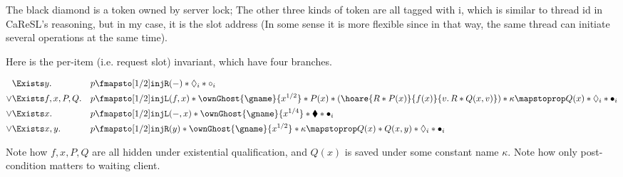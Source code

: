 \documentclass[11pt]{article}
\newcommand{\bdia}{\blacklozenge}
\newcommand{\dia}{\Diamond}
\newcommand{\injR}{\texttt{injR}}
\newcommand{\injL}{\texttt{injL}}
\begin{document}
The black diamond is a token owned by server lock; The other three kinds of token are all tagged with i, which is similar to thread id in CaReSL’s reasoning, but in my case, it is the slot address (In some sense it is more flexible since in that way, the same thread can initiate several operations at the same time).

Here is the per-item (i.e. request slot) invariant, which have four branches.

\begin{align*}
     &\Exists y.          &&p \fmapsto[1/2] \injR(-) * \dia_i * \circ_i\\
\lor &\Exists f, x, P, Q. &&p \fmapsto[1/2] \injL(f, x) * \ownGhost{\gname}{x^{1/2}} *
                           P(x) * (\hoare{R * P(x)}{f(x)}{v.\,R * Q(x, v)}) * \kappa \mapstoprop Q(x) * \dia_i * \bullet_i\\
\lor &\Exists x.          &&p \fmapsto[1/2] \injL(-, x) * \ownGhost{\gname}{x^{1/4}} * \bdia * \bullet_i\\
\lor &\Exists x, y.       &&p \fmapsto[1/2] \injR(y) * \ownGhost{\gname}{x^{1/2}} * \kappa \mapstoprop Q(x) * Q(x, y) * \dia_i * \bullet_i
\end{align*}


Note how $f, x, P, Q$ are all hidden under existential qualification, and $Q(x)$ is saved under some constant name $\kappa$. Note how only post-condition matters to waiting client.
\end{document}
